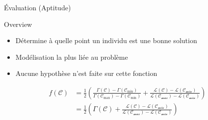 \begin{frame}{Évaluation (Aptitude)}


  \begin{block}{Overview}
    \begin{itemize}
      \item Détermine à quelle point un individu est une bonne solution
      \item Modélisation la plus liée au problème
      \item Aucune hypothèse n'est faite sur cette fonction
    \end{itemize}
  \end{block}

  \begin{align}
    f(\mathcal{C}) &= \frac{1}{2} \left(
      \frac{\Gamma(\mathcal{C}) - \Gamma(\mathcal{C}_{\textrm{min}})}
      {\Gamma(\mathcal{C}_{\textrm{max}}) - \Gamma(\mathcal{C}_{\textrm{min}})}
      +
      \frac{\mathcal{L(C)} - \mathcal{L(C_{\textrm{min}})}}
      {\mathcal{L(C_{\textrm{max}})} - \mathcal{L(C_{\textrm{min}})}}\right)\\
                   &= \frac{1}{2} \left(\Gamma(\mathcal{C})
        +\frac{\mathcal{L(C)} - \mathcal{L(C_{\textrm{min}})}}
        {\mathcal{L(C_{\textrm{max}})} - \mathcal{L(C_{\textrm{min}})}}\right)
  \end{align}
\end{frame}

